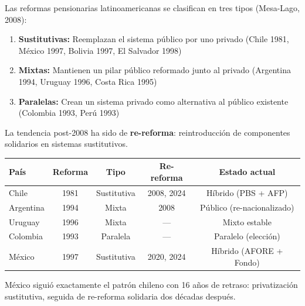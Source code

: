 \documentclass[11pt,a4paper]{report}
\begin{document}
\begin{tcolorbox}[colback=blue!5!white, colframe=blue!75!black, title=\textbf{Definici\'on Formal: Tipolog\'ia de Reformas}]
Las reformas pensionarias latinoamericanas se clasifican en tres tipos (Mesa-Lago, 2008):

\begin{enumerate}
  \item \textbf{Sustitutivas:} Reemplazan el sistema p\'ublico por uno privado (Chile 1981, M\'exico 1997, Bolivia 1997, El Salvador 1998)
  \item \textbf{Mixtas:} Mantienen un pilar p\'ublico reformado junto al privado (Argentina 1994, Uruguay 1996, Costa Rica 1995)
  \item \textbf{Paralelas:} Crean un sistema privado como alternativa al p\'ublico existente (Colombia 1993, Per\'u 1993)
\end{enumerate}

La tendencia post-2008 ha sido de \textbf{re-reforma}: reintroducci\'on de componentes solidarios en sistemas sustitutivos.
\end{tcolorbox}

\begin{tcolorbox}[colback=green!5!white, colframe=green!50!black, title=\textbf{Intuici\'on: Tabla Comparativa Regional}]
\begin{center}
\begin{tabular}{lcccc}
\toprule
\textbf{Pa\'is} & \textbf{Reforma} & \textbf{Tipo} & \textbf{Re-reforma} & \textbf{Estado actual} \\
\midrule
Chile & 1981 & Sustitutiva & 2008, 2024 & H\'ibrido (PBS + AFP) \\
Argentina & 1994 & Mixta & 2008 & P\'ublico (re-nacionalizado) \\
Uruguay & 1996 & Mixta & --- & Mixto estable \\
Colombia & 1993 & Paralela & --- & Paralelo (elecci\'on) \\
M\'exico & 1997 & Sustitutiva & 2020, 2024 & H\'ibrido (AFORE + Fondo) \\
\bottomrule
\end{tabular}
\end{center}

M\'exico sigui\'o exactamente el patr\'on chileno con 16 a\~nos de retraso: privatizaci\'on sustitutiva, seguida de re-reforma solidaria dos d\'ecadas despu\'es.
\end{tcolorbox}
\end{document}
